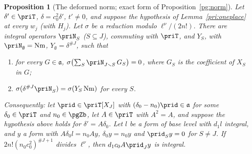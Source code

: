 \documentclass[10pt]{amsart}
\newtheorem{proposition}[theorem]{Proposition}
\theoremstyle{definition}
\theoremstyle{remark}
\begin{document}
\begin{proposition}[The deformed norm; exact form of Proposition~\ref{pg:norm}]\label{pri:norm}
Let $\delta'\in\priT$, $\delta=c_0^2\delta'$, $t'\ne0$, and suppose the hypothesis of
Lemma~\ref{pri:oneplace} at every $w_j$ (with $H_j$). Let $\sigma$ be a reduction modulo
$\ell^\nu/(2n!)$. There are integral operators $\priN_S$ ($S\subseteq J$), commuting with $\priT$,
and $Y_S$, with $\priN_\emptyset=\mathrm{Nm}$, $Y_\emptyset=\delta^{\#J}$, such that
\begin{enumerate}
\item[(a)] for every $G\in\mathfrak a$, $\sigma\bigl(\sum_S\priN_{J\smallsetminus S}\,G_S\bigr)=0$,
where $G_S$ is the coefficient of $X_S$ in $G$;
\item[(b)] $\sigma(\delta^{\#J}\priN_S)=\sigma(Y_S\,\mathrm{Nm})$ for every $S$.
\end{enumerate}
Consequently: let $\prid\in\priT[X_J]$ with $(\delta_0-n_0)\prid\in\mathfrak a$ for some $\delta_0\in
\priT$ and $n_0\in\pgZb$, let $A\in\priT$ with $A^2=A$, and suppose the hypothesis above holds for
$\delta'=A\delta_0$. Let $l$ be a form of base level with $d_1l$ integral, and $y$ a form with
$A\delta_0l=n_0Ay$, $\delta_0y=n_0y$ and $\prid_Sy=0$ for $S\ne J$. If $2n!(n_0c_0^2)^{\#J+1}$ divides
$\ell^\nu$, then $d_1c_0A\prid_Jy$ is integral.
\end{proposition}
\end{document}
